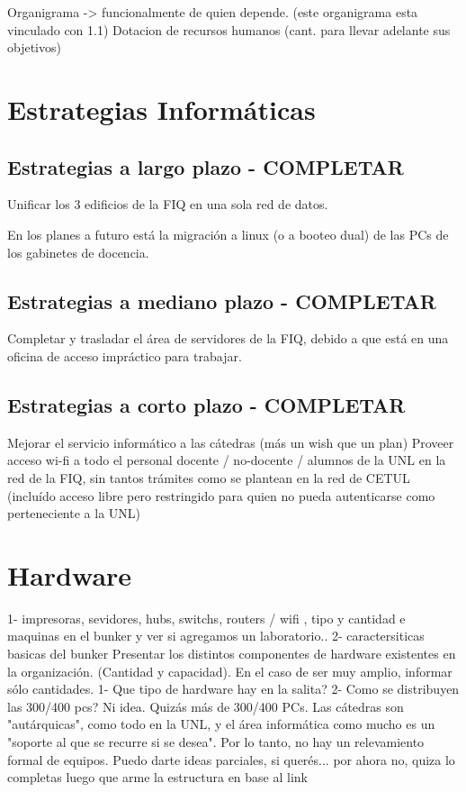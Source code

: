 \documentclass[10pt,a4paper,final]{article}
\begin{document}
    Organigrama -> funcionalmente de quien depende. (este organigrama esta vinculado con 1.1)
          Dotacion de recursos humanos (cant. para llevar adelante sus objetivos)
\section{Estrategias Informáticas}
\subsection{Estrategias a largo plazo - COMPLETAR}
Unificar los 3 edificios de la FIQ en una sola red de datos.

En los planes a futuro está la migración a linux (o a booteo dual) de las PCs de los gabinetes de docencia.
\subsection{Estrategias a mediano plazo - COMPLETAR}
Completar y trasladar el área de servidores de la FIQ, debido a que está en una oficina de acceso impráctico para trabajar.
\subsection{Estrategias a corto plazo - COMPLETAR}
Mejorar el servicio informático a las cátedras (más un wish que un plan)
Proveer acceso wi-fi a todo el personal docente / no-docente / alumnos de la UNL en la red de la FIQ, sin tantos trámites como se plantean en la red de CETUL (incluído acceso libre pero restringido para quien no pueda autenticarse como perteneciente a la UNL)

\section{Hardware}
1- impresoras, sevidores, hubs, switchs, routers / wifi , tipo y cantidad e maquinas en el bunker y ver si agregamos un laboratorio..
2- caractersiticas basicas del bunker
Presentar los distintos componentes de hardware existentes en la organización. (Cantidad y capacidad).
En el caso de ser muy amplio, informar sólo cantidades.
1- Que tipo de hardware hay en la salita?
2- Como se distribuyen las 300/400 pcs?
Ni idea. Quizás más de 300/400 PCs. Las cátedras son "autárquicas", como todo en la UNL, y el área informática como mucho es un "soporte al que se recurre si se desea". Por lo tanto, no hay un relevamiento formal de equipos.
Puedo darte ideas parciales, si querés...
por ahora no, quiza lo completas luego que arme la estructura en base al link
\end{document}
